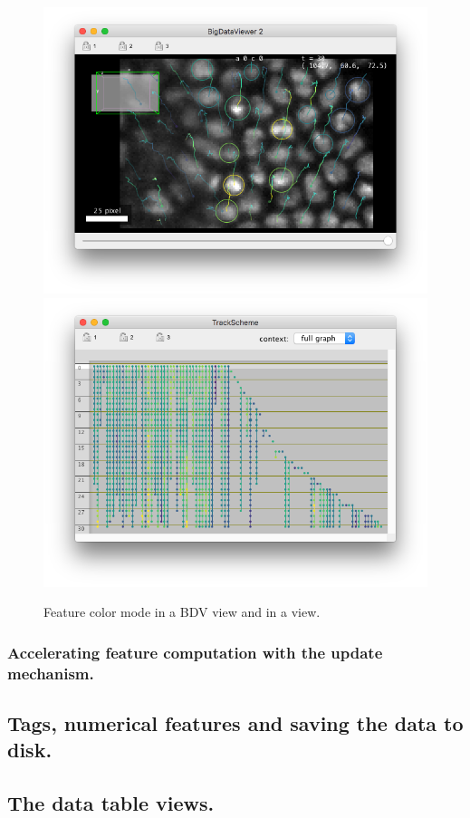 \begin{figure}
    \centering
    \null\hfill
    \includegraphics[height=0.23\textheight]{figures/Mastodon_FeatureColorBDV.png}
    \hfill
    \includegraphics[height=0.23\textheight]{figures/Mastodon_FeatureColorTrackScheme.png}
    \hfill\null
    
    \caption{Feature color mode in a BDV view and in a \TrackScheme view.  }
    \label{fig:FeatureColorModeView}
\end{figure}


















\subsubsection{Accelerating feature computation with the update mechanism.}


\subsection{Tags, numerical features and saving the data to disk.}

\subsection{The data table views.}

